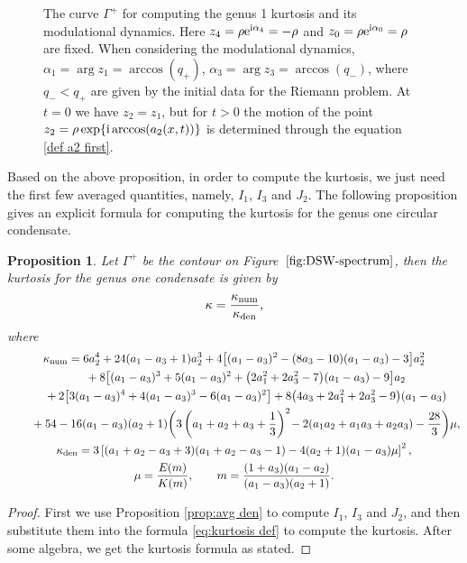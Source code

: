 \documentclass[pdftex]{sigma}
\numberwithin{equation}{section}
\newtheorem{Proposition}[Theorem]{Proposition}
\newcommand{\G}{\Gamma}
\def\G{\Gamma}
\begin{document}
\begin{figure}
{\begin{tikzpicture}[x=0.75pt,y=0.75pt,yscale=-1,xscale=1]
	
\end{tikzpicture}

   }
    \caption{The curve $\G^+$ for computing the genus 1 kurtosis and its modulational dynamics. Here $z_4=\rho {\rm e}^{{\rm i}\alpha_4}=-\rho$ and $z_0=\rho {\rm e}^{{\rm i}\alpha_0}=\rho$ are fixed. When considering the modulational dynamics, $\alpha_1=\arg z_1=\arccos(q_+)$, $\alpha_3=\arg z_3=\arccos(q_-)$, where $q_-<q_+$ are given by the initial data for the Riemann problem.  At $t=0$  we have $z_2=z_1$, but for $t>0$  the motion of the point $z_2=\rho\exp\{{\rm i}\arccos(a_2(x,t))\}$ is determined through the equation \eqref{def a2 first}.}
    \label{fig:DSW-spectrum}
\end{figure}


Based on the above proposition, in order to compute the kurtosis, we just need the first few averaged quantities, namely, $I_1$, $I_3$ and $J_2$. The following proposition gives an explicit formula for computing the kurtosis for the genus one circular condensate.

\begin{Proposition}\label{prop:g1 kur}
Let $\G^+$ be the contour on Figure~$\ref{fig:DSW-spectrum}$, then the kurtosis for the genus one condensate is given by
\begin{align}
\kappa=\frac{\kappa_{\rm num}}{\kappa_{\rm den}}, \label{eq:g1-kurtosis}
\end{align}
where
\begin{gather*}
\kappa_{\rm num}=6a_2^4+24(a_1-a_3+1)a_2^3+4\bigl[(a_1-a_3)^2-(8a_3-10)(a_1-a_3)-3\bigr]a_2^2\\ \qquad{}
+8\bigl[(a_1-a_3)^3+5(a_1-a_3)^2+\bigl(2a_1^2+2a_3^2-7\bigr)(a_1-a_3)-9\bigr]a_2\\ \qquad{}
+2\bigl[3(a_1-a_3)^4+4(a_1-a_3)^3-6(a_1-a_3)^2\bigr]+8\bigl(4a_3+2a_1^2+2a_3^2-9\bigr)(a_1-a_3)\\ \qquad{}
+54-16(a_1-a_3)(a_2+1)\biggl(3\left(a_1+a_2+a_3+\frac{1}{3}\right)^2\!-2(a_1a_2+a_1a_3+a_2a_3)-\frac{28}{3}\biggr)\mu,\\
\kappa_{\rm den}=3\left[(a_1+a_2-a_3+3)(a_1+a_2-a_3-1)-4(a_2+1)(a_1-a_3)\mu\right]^2,\\
\mu=\frac{E(m)}{K(m)},\qquad m=\frac{(1+a_3)(a_1-a_2)}{(a_1-a_3)(a_2+1)}.
\end{gather*}
\end{Proposition}

\begin{proof}
First we use Proposition \ref{prop:avg den} to compute $I_1$, $I_3$ and $J_2$, and then substitute them into the formula \eqref{eq:kurtosis def} to compute the kurtosis. After some algebra, we get the kurtosis formula as stated.
\end{proof}
\end{document}
